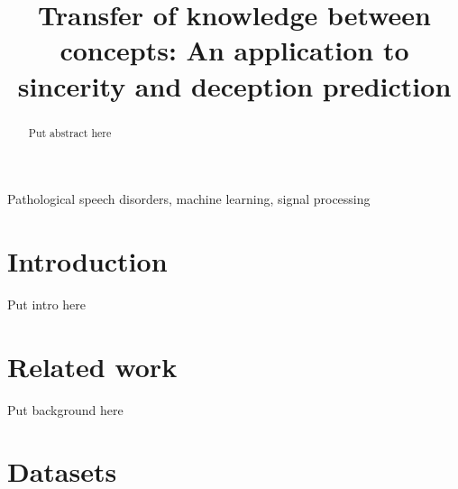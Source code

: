 \documentclass{article}
\title{Transfer of knowledge between concepts: An application to sincerity and deception prediction}
\begin{document}
\ninept
%
\maketitle
%
\begin{abstract}
   Put abstract here
 
\end{abstract}
%
\begin{keywords}
Pathological speech disorders, machine learning, signal processing 
\end{keywords}
%
\section{Introduction}
\label{sec:intro}
Put intro here

\section{Related work}
Put background here

\section{Datasets}

\end{document}
